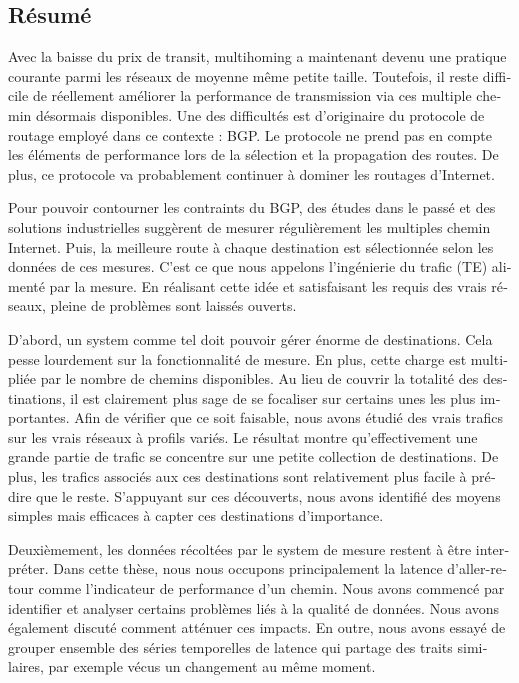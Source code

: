 \begin{otherlanguage}{french}
\chapter*{Résumé}
Avec la baisse du prix de transit, multihoming a maintenant devenu une pratique courante parmi les réseaux de moyenne même petite taille.
Toutefois, il reste difficile de réellement améliorer la performance de transmission via ces multiple chemin désormais disponibles.
Une des difficultés est d’originaire du protocole de routage employé dans ce contexte : \acf{BGP}.
Le protocole ne prend pas en compte les éléments de performance lors de la sélection et la propagation des routes.
De plus, ce protocole va probablement continuer à dominer les routages d’Internet.

Pour pouvoir contourner les contraints du \ac{BGP}, des études dans le passé et des solutions industrielles suggèrent de mesurer régulièrement les multiples chemin Internet.
Puis, la meilleure route à chaque destination est sélectionnée selon les données de ces mesures. C’est ce que nous appelons l’ingénierie du trafic (TE) alimenté par la mesure.
En réalisant cette idée et satisfaisant les requis des vrais réseaux, pleine de problèmes sont laissés ouverts.

D’abord, un system comme tel doit pouvoir gérer énorme de destinations.
Cela pesse lourdement sur la fonctionnalité de mesure.
En plus, cette charge est multipliée par le nombre de chemins disponibles.
Au lieu de couvrir la totalité des destinations, il est clairement plus sage de se focaliser sur certains unes les plus importantes.
Afin de vérifier que ce soit faisable, nous avons étudié des vrais trafics sur les vrais réseaux à profils variés.
Le résultat montre qu’effectivement une grande partie de trafic se concentre sur une petite collection de destinations.
De plus, les trafics associés aux ces destinations sont relativement plus facile à prédire que le reste.
S’appuyant sur ces découverts, nous avons identifié des moyens simples mais efficaces à capter ces destinations d’importance.

Deuxièmement, les données récoltées par le system de mesure restent à être interpréter.
Dans cette thèse, nous nous occupons principalement la latence d’aller-retour comme l’indicateur de performance d’un chemin.
Nous avons commencé par identifier et analyser certains problèmes liés à la qualité de données.
Nous avons également discuté comment atténuer ces impacts.
En outre, nous avons essayé de grouper ensemble des séries temporelles de latence qui partage des traits similaires, par exemple vécus un changement au même moment.


\end{otherlanguage}
